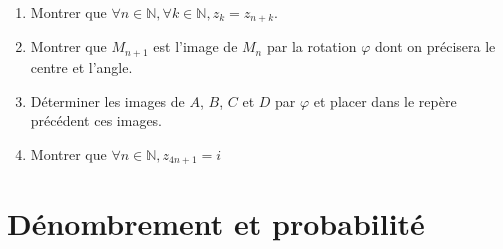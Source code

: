 \documentclass[13pts]{report}
\begin{document}
\begin{enumerate}
\begin{enumerate}
					\begin{enumerate}
						\item Montrer que $\forall n \in \mathbb{N}, \forall k \in \mathbb{N}, z_k=z_{n+k}$.
						\item Montrer que $M_{n+1}$ est l'image de $M_n$ par la rotation $\varphi$ dont on précisera le centre et l'angle.
						\item Déterminer les images de $A$, $B$, $C$ et $D$ par $\varphi$ et placer dans le repère précédent ces images.
						\item Montrer que $\forall n\in \mathbb{N}, z_{4n+1}=i$
					\end{enumerate}
			\end{enumerate}
	\end{enumerate}
	
	\chapter{Dénombrement et probabilité}
\end{document}
